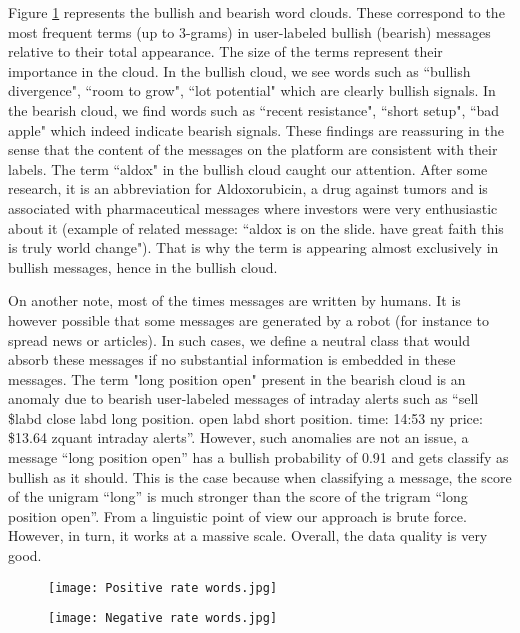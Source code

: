 Figure \ref{wordclouds} represents the bullish and bearish word clouds. These correspond to the most frequent terms (up to 3-grams) in user-labeled bullish (bearish) messages relative to their total appearance. The size of the terms represent their importance in the cloud. In the bullish cloud, we see words such as ``bullish divergence", ``room to grow", ``lot potential" which are clearly bullish signals. In the bearish cloud, we find words such as ``recent resistance", ``short setup", ``bad apple" which indeed indicate bearish signals. These findings are reassuring in the sense that the content of the messages on the platform are consistent with their labels. The term ``aldox" in the bullish cloud caught our attention. After some research, it is an abbreviation for Aldoxorubicin, a drug against tumors and is associated with pharmaceutical messages where investors were very enthusiastic about it (example of related message: ``aldox is on the slide. have great faith this is truly world change"). That is why the term is appearing almost exclusively in bullish messages, hence in the bullish cloud.

On another note, most of the times messages are written by humans. It is however possible that some messages are generated by a robot (for instance to spread news or articles). In such cases, we define a neutral class that would absorb these messages if no substantial information is embedded in these messages. The term "long position open" present in the bearish cloud is an anomaly due to bearish user-labeled messages of intraday alerts such as “sell \$labd close labd long position. open labd short position. time: 14:53 ny price: \$13.64 zquant intraday alerts”. However, such anomalies are not an issue, a message “long position open” has a bullish probability of 0.91 and gets classify as bullish as it should. This is the case because when classifying a message, the score of the unigram “long” is much stronger than the score of the trigram “long position open”. From a linguistic point of view our approach is brute force. However, in turn, it works at a massive scale. Overall, the data quality is very good.


\begin{figure}
\begin{center}
    \texttt{[image: Positive rate words.jpg]}

    \vspace{1cm}

    \texttt{[image: Negative rate words.jpg]}
   \vspace{0.1cm}
    \label{wordclouds}
  \end{center}
\end{figure}


